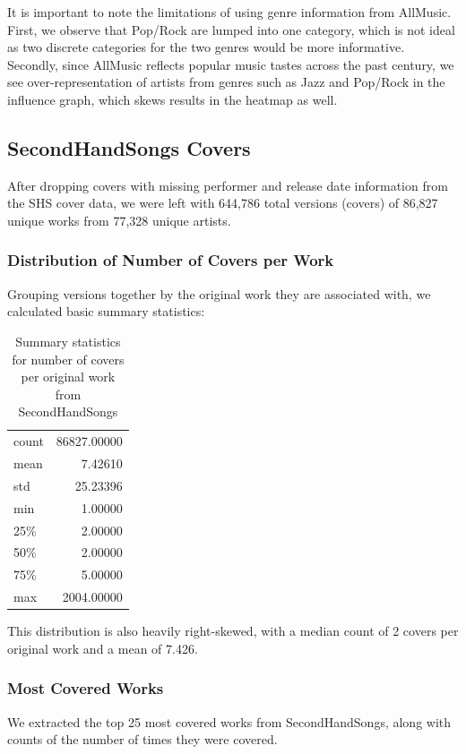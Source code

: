 It is important to note the limitations of using genre information from AllMusic. First, we observe that Pop/Rock are lumped into one category, which is not ideal as two discrete categories for the two genres would be more informative. Secondly, since AllMusic reflects popular music tastes across the past century, we see over-representation of artists from genres such as Jazz and Pop/Rock in the influence graph, which skews results in the heatmap as well.

\subsection{SecondHandSongs Covers}
After dropping covers with missing performer and release date information from the SHS cover data, we were left with 644,786 total versions (covers) of 86,827 unique works from 77,328 unique artists.

\subsubsection*{Distribution of Number of Covers per Work}
Grouping versions together by the original work they are associated with, we calculated basic summary statistics:

\begin{table}[H]
\centering
\caption{Summary statistics for number of covers per original work from SecondHandSongs}
\label{my-label}
\begin{tabular}{lr}
count &  86827.00000 \\
mean  &      7.42610 \\
std   &     25.23396 \\
min   &      1.00000 \\
25\%   &      2.00000 \\
50\%   &      2.00000 \\
75\%   &      5.00000 \\
max   &   2004.00000 \\
\end{tabular}
\end{table}

This distribution is also heavily right-skewed, with a median count of 2 covers per original work and a mean of 7.426.

\subsubsection*{Most Covered Works}
We extracted the top 25 most covered works from SecondHandSongs, along with counts of the number of times they were covered.

